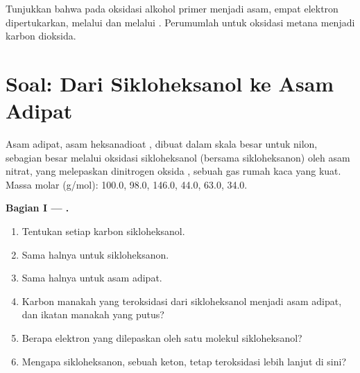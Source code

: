 \begin{exercise}[$\star\star\star$]\label{exo:b1:organic-redox:12}
Tunjukkan bahwa pada oksidasi alkohol primer menjadi asam, empat elektron
dipertukarkan, melalui  dan melalui .
Perumumlah untuk oksidasi metana menjadi karbon dioksida.
\end{exercise}

\section{Soal: Dari Sikloheksanol ke Asam Adipat}

\begin{problem}
\label{pb:b1:organic-redox:1}
Asam adipat, asam heksanadioat , dibuat dalam skala
besar untuk nilon, sebagian besar melalui oksidasi sikloheksanol (bersama
sikloheksanon) oleh asam nitrat, yang melepaskan dinitrogen oksida
, sebuah gas rumah kaca yang kuat. Massa molar (\unit{g/mol}):
 100.0,  98.0,  146.0,  44.0,
 63.0,  34.0.

\medskip
\noindent\textbf{Bagian I --- .}
\begin{enumerate}
  \item Tentukan  setiap karbon sikloheksanol.
  \item Sama halnya untuk sikloheksanon.
  \item Sama halnya untuk asam adipat.
  \item Karbon manakah yang teroksidasi dari sikloheksanol menjadi asam
        adipat, dan ikatan manakah yang putus?
  \item Berapa elektron yang dilepaskan oleh satu molekul sikloheksanol?
  \item Mengapa sikloheksanon, sebuah keton, tetap teroksidasi lebih lanjut
        di sini?
\end{enumerate}


\end{problem}
